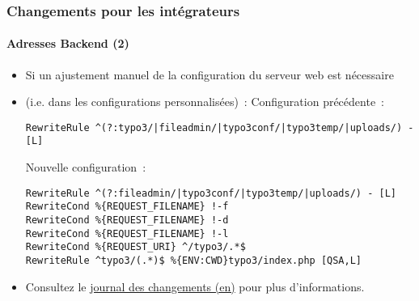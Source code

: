 %

\begin{frame}[fragile]
	\frametitle{Changements pour les intégrateurs}
	\framesubtitle{Adresses Backend (2)}


	\begin{itemize}
		\item Si un ajustement manuel de la configuration du serveur web est nécessaire
		\item
			(i.e. dans les configurations personnalisées)~:\newline
		\smaller
			Configuration précédente~:
		\normalsize
\begin{lstlisting}
RewriteRule ^(?:typo3/|fileadmin/|typo3conf/|typo3temp/|uploads/) - [L]
\end{lstlisting}

		\smaller
			Nouvelle configuration~:
		\normalsize
\begin{lstlisting}
RewriteRule ^(?:fileadmin/|typo3conf/|typo3temp/|uploads/) - [L]
RewriteCond %{REQUEST_FILENAME} !-f
RewriteCond %{REQUEST_FILENAME} !-d
RewriteCond %{REQUEST_FILENAME} !-l
RewriteCond %{REQUEST_URI} ^/typo3/.*$
RewriteRule ^typo3/(.*)$ %{ENV:CWD}typo3/index.php [QSA,L]
\end{lstlisting}

		\item Consultez le \href{https://docs.typo3.org/c/typo3/cms-core/master/en-us/Changelog/11.0/Breaking-93048-BackendURLRewrites.html}{journal des changements (en)}
			pour plus d'informations.

	\end{itemize}
\end{frame}

